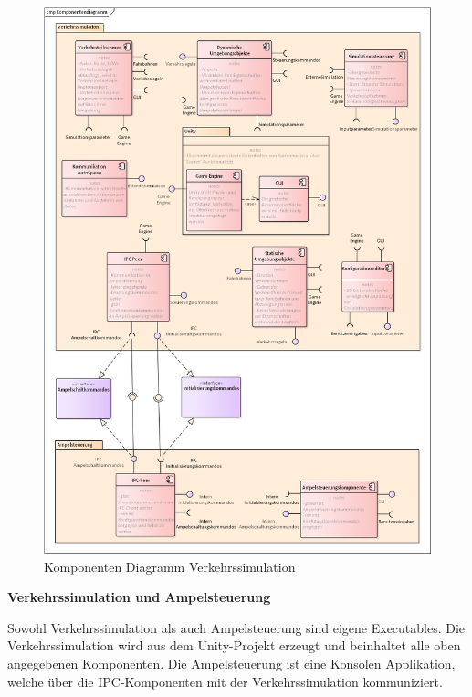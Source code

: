 \begin{figure}[H]
\begin{center}
	\includegraphics[width=1\textwidth]{BilderAllgemein/Komponentendiagramm.png}
\end{center}
	\caption{Komponenten Diagramm Verkehrssimulation}
	\label{fig_2_1}
\end{figure}

\begin{flushleft}
\textbf{Verkehrssimulation und Ampelsteuerung}
\end{flushleft}
\vspace{-0.3 cm}

Sowohl Verkehrssimulation als auch Ampelsteuerung sind eigene Executables. Die Verkehrssimulation wird aus dem Unity-Projekt erzeugt und beinhaltet alle oben angegebenen Komponenten. Die Ampelsteuerung ist eine Konsolen Applikation, welche über die IPC-Komponenten mit der Verkehrssimulation kommuniziert.

